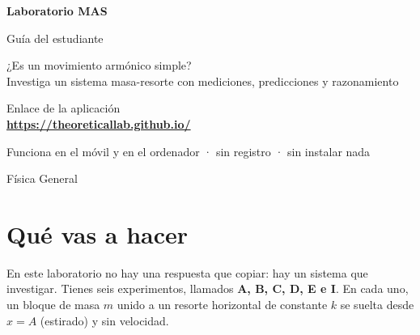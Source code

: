 \documentclass[11pt,a4paper]{article}
\begin{document}
\begin{titlepage}
\centering
\vspace*{1.5cm}

\vspace{1.2cm}
{\Huge\bfseries Laboratorio \textcolor{acento}{MAS}\par}
\vspace{0.4cm}
{\Large Guía del estudiante\par}
\vspace{0.8cm}
{\large ¿Es un movimiento armónico simple?\\ Investiga un sistema masa-resorte con mediciones, predicciones y razonamiento\par}
\vspace{1.5cm}
\begin{tcolorbox}[colback=acentof,colframe=acento,width=.75\textwidth,halign=center,arc=2mm]
\large Enlace de la aplicación\\[3pt]
\Large\bfseries\url{https://theoreticallab.github.io/}
\end{tcolorbox}
\vspace{1cm}
{\normalsize Funciona en el móvil y en el ordenador · sin registro · sin instalar nada\par}
\vfill
{\small\textcolor{suave}{Física General}\par}
\end{titlepage}

\tableofcontents
\newpage

\section{Qué vas a hacer}

En este laboratorio no hay una respuesta que copiar: hay un sistema que investigar. Tienes seis experimentos, llamados \textbf{A, B, C, D, E e I}. En cada uno, un bloque de masa $m$ unido a un resorte horizontal de constante $k$ se suelta desde $x = A$ (estirado) y sin velocidad.
\end{document}
